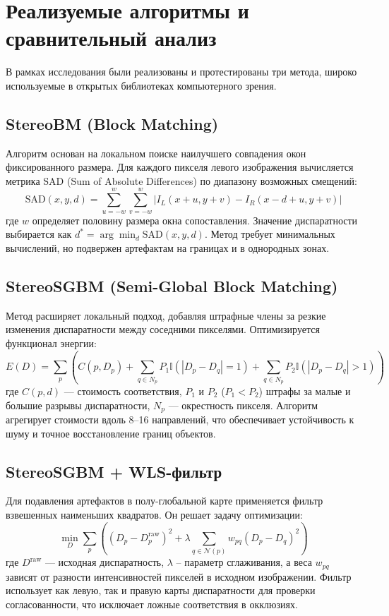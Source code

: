 	\section{Реализуемые алгоритмы и сравнительный анализ}
	В рамках исследования были реализованы и протестированы три метода, широко используемые в открытых библиотеках компьютерного зрения.
	
	\subsection{StereoBM (Block Matching)}
	Алгоритм основан на локальном поиске наилучшего совпадения окон фиксированного размера. Для каждого пикселя левого изображения вычисляется метрика SAD (Sum of Absolute Differences) по диапазону возможных смещений:
	\[
	\text{SAD}(x,y,d) = \sum_{u=-w}^{w} \sum_{v=-w}^{w} \left| I_L(x+u, y+v) - I_R(x-d+u, y+v) \right|
	\]
	где $w$ определяет половину размера окна сопоставления. Значение диспаратности выбирается как $d^* = \arg\min_d \text{SAD}(x,y,d)$. Метод требует минимальных вычислений, но подвержен артефактам на границах и в однородных зонах.
	
	\subsection{StereoSGBM (Semi-Global Block Matching)}
	Метод расширяет локальный подход, добавляя штрафные члены за резкие изменения диспаратности между соседними пикселями. Оптимизируется функционал энергии:
	\[
	E(D) = \sum_{p} \left( C(p, D_p) + \sum_{q \in N_p} P_1 \mathbb{I}(|D_p - D_q| = 1) + \sum_{q \in N_p} P_2 \mathbb{I}(|D_p - D_q| > 1) \right)
	\]
	где $C(p, d)$ — стоимость соответствия, $P_1$ и $P_2$ ($P_1 < P_2$) штрафы за малые и большие разрывы диспаратности, $N_p$ — окрестность пикселя. Алгоритм агрегирует стоимости вдоль 8--16 направлений, что обеспечивает устойчивость к шуму и точное восстановление границ объектов.
	
	\subsection{StereoSGBM + WLS-фильтр}
	Для подавления артефактов в полу-глобальной карте применяется фильтр взвешенных наименьших квадратов. Он решает задачу оптимизации:
	\[
	\min_D \sum_{p} \left( (D_p - D^{\text{raw}}_p)^2 + \lambda \sum_{q \in \mathcal{N}(p)} w_{pq} (D_p - D_q)^2 \right)
	\]
	где $D^{\text{raw}}$ — исходная диспаратность, $\lambda$ -- параметр сглаживания, а веса $w_{pq}$ зависят от разности интенсивностей пикселей в исходном изображении. Фильтр использует как левую, так и правую карты диспаратности для проверки согласованности, что исключает ложные соответствия в окклюзиях.
	
